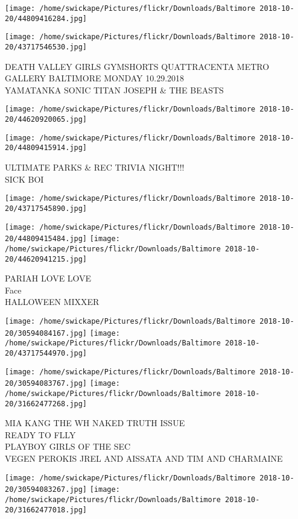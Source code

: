 \documentclass[10pt,letterpaper]{article}
\begin{document}
\texttt{[image: /home/swickape/Pictures/flickr/Downloads/Baltimore 2018-10-20/44809416284.jpg]}

\vspace{0.25in}
\texttt{[image: /home/swickape/Pictures/flickr/Downloads/Baltimore 2018-10-20/43717546530.jpg]}

DEATH VALLEY GIRLS GYMSHORTS QUATTRACENTA METRO GALLERY BALTIMORE MONDAY 10.29.2018\\
YAMATANKA SONIC TITAN JOSEPH \& THE BEASTS
\pagebreak

\texttt{[image: /home/swickape/Pictures/flickr/Downloads/Baltimore 2018-10-20/44620920065.jpg]}

\vspace{0.25in}
\texttt{[image: /home/swickape/Pictures/flickr/Downloads/Baltimore 2018-10-20/44809415914.jpg]}

ULTIMATE PARKS \& REC TRIVIA NIGHT!!!\\
SICK BOI
\pagebreak

\texttt{[image: /home/swickape/Pictures/flickr/Downloads/Baltimore 2018-10-20/43717545890.jpg]}

\vspace{0.25in}
\texttt{[image: /home/swickape/Pictures/flickr/Downloads/Baltimore 2018-10-20/44809415484.jpg]}
\texttt{[image: /home/swickape/Pictures/flickr/Downloads/Baltimore 2018-10-20/44620941215.jpg]}

PARIAH LOVE LOVE\\
Face\\
HALLOWEEN MIXXER
\pagebreak

\texttt{[image: /home/swickape/Pictures/flickr/Downloads/Baltimore 2018-10-20/30594084167.jpg]}
\texttt{[image: /home/swickape/Pictures/flickr/Downloads/Baltimore 2018-10-20/43717544970.jpg]}

\texttt{[image: /home/swickape/Pictures/flickr/Downloads/Baltimore 2018-10-20/30594083767.jpg]}
\texttt{[image: /home/swickape/Pictures/flickr/Downloads/Baltimore 2018-10-20/31662477268.jpg]}

MIA KANG THE WH NAKED TRUTH ISSUE\\
READY TO FLLY\\
PLAYBOY GIRLS OF THE SEC\\
VEGEN PEROKIS JREL AND AISSATA AND TIM AND CHARMAINE
\pagebreak

\texttt{[image: /home/swickape/Pictures/flickr/Downloads/Baltimore 2018-10-20/30594083267.jpg]}
\texttt{[image: /home/swickape/Pictures/flickr/Downloads/Baltimore 2018-10-20/31662477018.jpg]}
\end{document}
